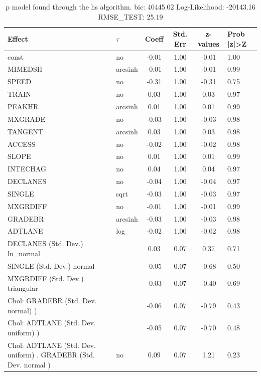 \begin{table}
	\caption{p model found through the hs algorithm. bic: 40445.02 Log-Likelihood: -20143.16 RMSE_TEST: 25.19}
	\begin{center}
		\begin{tabular}{|l|l|c|c|c|l|}
			\hline
			Effect & $\tau$ & Coeff & Std. Err & z-values & Prob |z|>Z \\
			\hline
			const & no & -0.01 & 1.00 & -0.01 & 1.00 \\
			\hline
			MIMEDSH & arcsinh & -0.01 & 1.00 & -0.01 & 0.99 \\
			\hline
			SPEED & no & -0.31 & 1.00 & -0.31 & 0.75 \\
			\hline
			TRAIN & no & 0.03 & 1.00 & 0.03 & 0.97 \\
			\hline
			PEAKHR & arcsinh & 0.01 & 1.00 & 0.01 & 0.99 \\
			\hline
			MXGRADE & no & -0.03 & 1.00 & -0.03 & 0.98 \\
			\hline
			TANGENT & arcsinh & 0.03 & 1.00 & 0.03 & 0.98 \\
			\hline
			ACCESS & no & -0.02 & 1.00 & -0.02 & 0.98 \\
			\hline
			SLOPE & no & 0.01 & 1.00 & 0.01 & 0.99 \\
			\hline
			INTECHAG & no & 0.04 & 1.00 & 0.04 & 0.97 \\
			\hline
			DECLANES & no & -0.04 & 1.00 & -0.04 & 0.97 \\
			\hline
			SINGLE & sqrt & -0.03 & 1.00 & -0.03 & 0.97 \\
			\hline
			MXGRDIFF & no & -0.01 & 1.00 & -0.01 & 0.99 \\
			\hline
			GRADEBR & arcsinh & -0.03 & 1.00 & -0.03 & 0.98 \\
			\hline
			ADTLANE & log & -0.02 & 1.00 & -0.02 & 0.98 \\
			\hline
			DECLANES (Std. Dev.) ln_normal &  & 0.03 & 0.07 & 0.37 & 0.71 \\
			\hline
			SINGLE (Std. Dev.) normal &  & -0.05 & 0.07 & -0.68 & 0.50 \\
			\hline
			MXGRDIFF (Std. Dev.) triangular &  & -0.03 & 0.07 & -0.40 & 0.69 \\
			\hline
			 Chol: GRADEBR (Std. Dev. normal) ) &  & -0.06 & 0.07 & -0.79 & 0.43 \\
			\hline
			 Chol: ADTLANE (Std. Dev. uniform) ) &  & -0.05 & 0.07 & -0.70 & 0.48 \\
			\hline
			 Chol: ADTLANE (Std. Dev. uniform) . GRADEBR (Std. Dev.   normal ) & no & 0.09 & 0.07 & 1.21 & 0.23 \\

\end{tabular}
\end{center}
\end{table}
